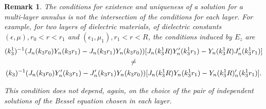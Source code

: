 \documentclass[12pt,%
    twoside,%
    a4paper,%
    openright, %
    ]{book}
\numberwithin{equation}{section} %
\newtheorem{remark}[thm]{Remark}
\begin{document}
            \begin{remark}
                The conditions for existence and uniqueness of a solution for a multi-layer annulus is not the intersection of the conditions for each layer. For example, for two layers of dielectric materials, of dielectric constants $(\epsilon, \mu), r_0<r<r_1$ and $(\epsilon_1, \mu_1), r_1<r<R$, the conditions induced by $E_z$ are
                \begin{multline*}
                    (k_3^1)^{-1}(J_n(k_3r_0)Y_n(k_3r_1)-J_n(k_3r_1)Y_n(k_3r_0))[J_n(k_3^1R)Y'_n(k_3^1r_1)-Y_n(k_3^1R)J'_n(k_3^1r_1)]
                    \cr
                    \not=
                    \\
                    (k_3)^{-1}(J_n(k_3r_0)Y'_n(k_3r_1)-J'_n(k_3r_1)Y_n(k_3r_0))[J_n(k_3^1R)Y_n(k_3^1r_1)-Y_n(k_3^1R)'_n(k_3^1r_1)].
                \end{multline*}

                This condition does not depend, again, on the choice of the pair of independent solutions of the Bessel equation chosen in each layer.
            \end{remark}
\end{document}
